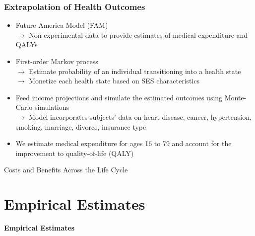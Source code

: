 \documentclass[static]{JJH-Beamer}
\begin{document}
\begin{frame}
\frametitle{Extrapolation of Health Outcomes}
\begin{itemize}
	\item Future America Model (FAM) \\
		$\rightarrow$ Non-experimental data to provide estimates of medical expenditure and QALYs \citep{Goldman_etal_2015_Future-America-Model}
	\item First-order Markov process \\
	$\rightarrow$ Estimate probability of an individual transitioning into a health state \\
	$\rightarrow$ Monetize each health state based on SES characteristics
	\item Feed income projections and simulate the estimated outcomes using Monte-Carlo simulations \\
	 $\rightarrow$ Model incorporates subjects' data on heart disease, cancer, hypertension, smoking, marriage, divorce, insurance type
	 \item We estimate medical expenditure for ages 16 to 79 and account for the improvement to quality-of-life (QALY)
\end{itemize}
\end{frame}


\begin{frame} \label{costs}
\begin{table}
\begin{center}
\caption{Costs and Benefits Across the Life Cycle} 
\scalebox{0.48}{}
\end{center}
\end{table}
\hyperlink{components}{}
\end{frame}


\section{Empirical Estimates}

\begin{frame}[noframenumbering]

\begin{block}{}
\begin{center}
\textbf{Empirical Estimates}
\end{center}
\end{block}

\end{frame}
\end{document}
